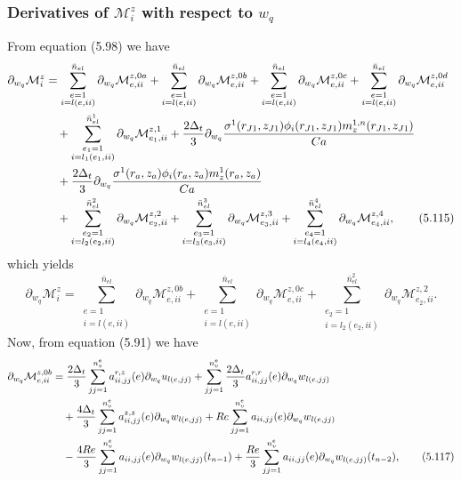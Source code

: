 \documentclass{article}
\begin{document}
\subsubsection{Derivatives of $\mathcal{M}_i^z$ with respect to $w_q$} %
From equation (5.98) we have
\begin{align}
\partial_{w_q}\mathcal{M}_i^z &= \sum_{\substack{e=1\\ i=l(e,ii)}}^{\bar{n}_{el}} \partial_{w_q} \mathcal{M}_{e,ii}^{z,0a} + \sum_{\substack{e=1\\ i=l(e,ii)}}^{\bar{n}_{el}} \partial_{w_q} \mathcal{M}_{e,ii}^{z,0b} + \sum_{\substack{e=1\\ i=l(e,ii)}}^{\bar{n}_{el}} \partial_{w_q} \mathcal{M}_{e,ii}^{z,0c} + \sum_{\substack{e=1\\ i=l(e,ii)}}^{\bar{n}_{el}} \partial_{w_q} \mathcal{M}_{e,ii}^{z,0d} \nonumber\\
&\quad + \sum_{\substack{e_1=1\\ i=l_1(e_1,ii)}}^{\bar{n}_{el}^1} \partial_{w_q} \mathcal{M}_{e_1,ii}^{z,1} + \frac{2\Delta_t}{3} \partial_{w_q} \frac{\sigma^1(r_{J1},z_{J1}) \phi_i(r_{J1},z_{J1}) m_z^{1,n}(r_{J1},z_{J1})}{Ca} \nonumber\\
&\quad + \frac{2\Delta_t}{3} \partial_{w_q} \frac{\sigma^1(r_a,z_a) \phi_i(r_a,z_a) m_z^{1}(r_a,z_a)}{Ca} \nonumber\\
&\quad + \sum_{\substack{e_2=1\\ i=l_2(e_2,ii)}}^{\bar{n}_{el}^2} \partial_{w_q} \mathcal{M}_{e_2,ii}^{z,2} + \sum_{\substack{e_3=1\\ i=l_3(e_3,ii)}}^{\bar{n}_{el}^3} \partial_{w_q} \mathcal{M}_{e_3,ii}^{z,3} + \sum_{\substack{e_4=1\\ i=l_4(e_4,ii)}}^{\bar{n}_{el}^4} \partial_{w_q} \mathcal{M}_{e_4,ii}^{z,4}, \tag{5.115}
\end{align}
which yields
\begin{equation}
\partial_{w_q}\mathcal{M}_i^z = \sum_{\substack{e=1\\ i=l(e,ii)}}^{\bar{n}_{el}} \partial_{w_q} \mathcal{M}_{e,ii}^{z,0b} + \sum_{\substack{e=1\\ i=l(e,ii)}}^{\bar{n}_{el}} \partial_{w_q} \mathcal{M}_{e,ii}^{z,0c} + \sum_{\substack{e_2=1\\ i=l_2(e_2,ii)}}^{\bar{n}_{el}^2} \partial_{w_q} \mathcal{M}_{e_2,ii}^{z,2}. \tag{5.116}
\end{equation}
Now, from equation (5.91) we have
\begin{align}
\partial_{w_q}\mathcal{M}_{e,ii}^{z,0b} &= \frac{2\Delta_t}{3} \sum_{jj=1}^{n_v^e} a_{ii,jj}^{r,z}(e) \partial_{w_q} u_{l(e,jj)} + \sum_{jj=1}^{n_v^e} \frac{2\Delta_t}{3} a_{ii,jj}^{r,r}(e) \partial_{w_q} w_{l(e,jj)} \nonumber\\
&\quad + \frac{4\Delta_t}{3} \sum_{jj=1}^{n_v^e} a_{ii,jj}^{z,z}(e) \partial_{w_q} w_{l(e,jj)} + Re \sum_{jj=1}^{n_v^e} a_{ii,jj}(e) \partial_{w_q} w_{l(e,jj)} \nonumber\\
&\quad - \frac{4Re}{3} \sum_{jj=1}^{n_v^e} a_{ii,jj}(e) \partial_{w_q} w_{l(e,jj)}(t_{n-1}) + \frac{Re}{3} \sum_{jj=1}^{n_v^e} a_{ii,jj}(e) \partial_{w_q} w_{l(e,jj)}(t_{n-2}), \tag{5.117}
\end{align}
\end{document}
